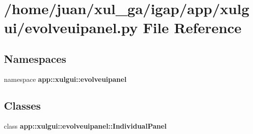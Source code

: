 \section{/home/juan/xul\_\-ga/igap/app/xulgui/evolveuipanel.py File Reference}
\label{xulgui_2evolveuipanel_8py}
\subsection*{Namespaces}
\begin{CompactItemize}
\item 
namespace {\bf app::xulgui::evolveuipanel}
\end{CompactItemize}
\subsection*{Classes}
\begin{CompactItemize}
\item 
class {\bf app::xulgui::evolveuipanel::IndividualPanel}
\end{CompactItemize}
